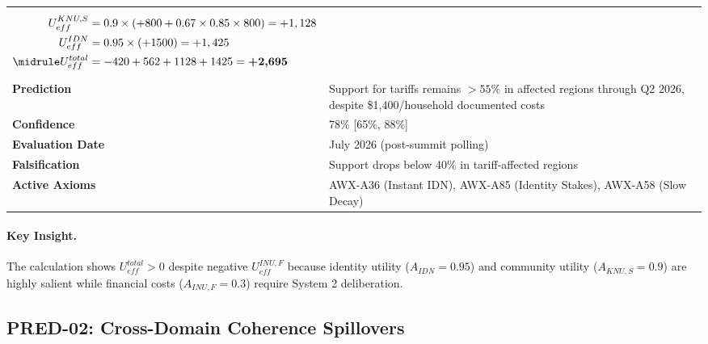 \begin{table}[htbp]
\begin{tabular}{p{3cm}p{11cm}}
\begin{align*}
U_{eff}^{KNU,S} &= 0.9 \times (+800 + 0.67 \times 0.85 \times 800) = +1,128 \\
U_{eff}^{IDN} &= 0.95 \times (+1500) = +1,425 \\
\midrule
U_{eff}^{total} &= -420 + 562 + 1128 + 1425 = \textbf{+2,695}
\end{align*} \\
\textbf{Prediction} & Support for tariffs remains $>55\%$ in affected regions through Q2 2026, despite \$1,400/household documented costs \\
\textbf{Confidence} & 78\% [65\%, 88\%] \\
\textbf{Evaluation Date} & July 2026 (post-summit polling) \\
\textbf{Falsification} & Support drops below 40\% in tariff-affected regions \\
\textbf{Active Axioms} & AWX-A36 (Instant IDN), AWX-A85 (Identity Stakes), AWX-A58 (Slow Decay) \\
\bottomrule
\end{tabular}
\end{table}

\paragraph{Key Insight.} The calculation shows $U_{eff}^{total} > 0$ despite negative $U_{eff}^{INU,F}$ 
because identity utility ($A_{IDN} = 0.95$) and community utility ($A_{KNU,S} = 0.9$) are highly 
salient while financial costs ($A_{INU,F} = 0.3$) require System 2 deliberation.


\subsection{PRED-02: Cross-Domain Coherence Spillovers}
\label{subsec:pred-02-calc}

